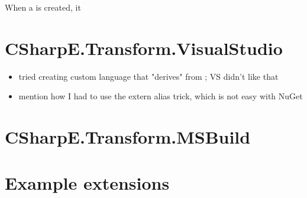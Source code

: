 \medskip

When a  is created, it 

\section{CSharpE.Transform.VisualStudio}

\begin{itemize}
\item tried creating custom language that "derives" from ; VS didn't like that
\item mention how I had to use the extern alias trick, which is not easy with NuGet
\end{itemize}

\section{CSharpE.Transform.MSBuild}

\section{Example extensions}
